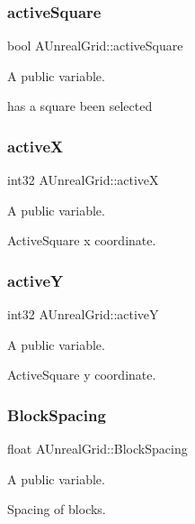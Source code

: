 \subsubsection{\texorpdfstring{active\+Square}{activeSquare}}
{\footnotesize\ttfamily bool A\+Unreal\+Grid\+::active\+Square}



A public variable. 

has a square been selected \hypertarget{class_a_unreal_grid_ab968c97a7b73c4c4a78752810340db86}{}\label{class_a_unreal_grid_ab968c97a7b73c4c4a78752810340db86} 
\subsubsection{\texorpdfstring{activeX}{activeX}}
{\footnotesize\ttfamily int32 A\+Unreal\+Grid\+::activeX}



A public variable. 

Active\+Square x coordinate. \hypertarget{class_a_unreal_grid_a112aaee76dadd64d889a14d1fc25cb2a}{}\label{class_a_unreal_grid_a112aaee76dadd64d889a14d1fc25cb2a} 
\subsubsection{\texorpdfstring{activeY}{activeY}}
{\footnotesize\ttfamily int32 A\+Unreal\+Grid\+::activeY}



A public variable. 

Active\+Square y coordinate. \hypertarget{class_a_unreal_grid_ab7f6c7b674ee42393ddad1a070e94ead}{}\label{class_a_unreal_grid_ab7f6c7b674ee42393ddad1a070e94ead} 
\subsubsection{\texorpdfstring{Block\+Spacing}{BlockSpacing}}
{\footnotesize\ttfamily float A\+Unreal\+Grid\+::\+Block\+Spacing}



A public variable. 

Spacing of blocks. \hypertarget{class_a_unreal_grid_a190e16b669bb5cb44c29765ba772c3f5}{}\label{class_a_unreal_grid_a190e16b669bb5cb44c29765ba772c3f5} 
